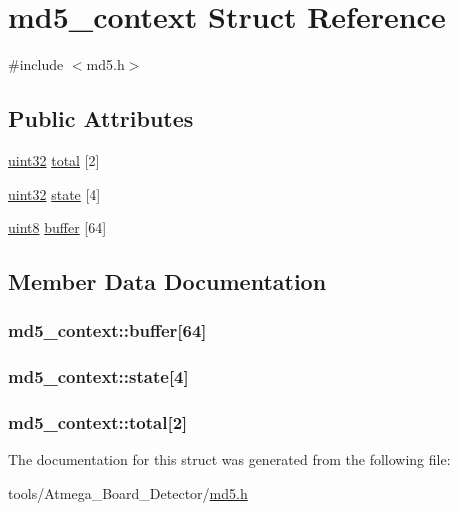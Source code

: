 \hypertarget{structmd5__context}{\section{md5\-\_\-context Struct Reference}
\label{structmd5__context}
}


{\ttfamily \#include $<$md5.\-h$>$}

\subsection*{Public Attributes}
\begin{DoxyCompactItemize}
\item 
\hyperlink{md5_8h_a9695cf1104606879c5d3f0221635a069}{uint32} \hyperlink{structmd5__context_af2e722f204e753ec78f5a672003cca1c}{total} \mbox{[}2\mbox{]}
\item 
\hyperlink{md5_8h_a9695cf1104606879c5d3f0221635a069}{uint32} \hyperlink{structmd5__context_afa3aede93fd3760573852eff7c24494a}{state} \mbox{[}4\mbox{]}
\item 
\hyperlink{md5_8h_a2d25bcd37166cc98f0d823cdb8c553ef}{uint8} \hyperlink{structmd5__context_ad668d3cb5e0affbbd214a69da28c6d55}{buffer} \mbox{[}64\mbox{]}
\end{DoxyCompactItemize}


\subsection{Member Data Documentation}
\hypertarget{structmd5__context_ad668d3cb5e0affbbd214a69da28c6d55}{
\subsubsection[{buffer}]{ md5\-\_\-context\-::buffer\mbox{[}64\mbox{]}}}\label{structmd5__context_ad668d3cb5e0affbbd214a69da28c6d55}
\hypertarget{structmd5__context_afa3aede93fd3760573852eff7c24494a}{
\subsubsection[{state}]{ md5\-\_\-context\-::state\mbox{[}4\mbox{]}}}\label{structmd5__context_afa3aede93fd3760573852eff7c24494a}
\hypertarget{structmd5__context_af2e722f204e753ec78f5a672003cca1c}{
\subsubsection[{total}]{ md5\-\_\-context\-::total\mbox{[}2\mbox{]}}}\label{structmd5__context_af2e722f204e753ec78f5a672003cca1c}


The documentation for this struct was generated from the following file\-:\begin{DoxyCompactItemize}
\item 
tools/\-Atmega\-\_\-\-Board\-\_\-\-Detector/\hyperlink{md5_8h}{md5.\-h}\end{DoxyCompactItemize}
